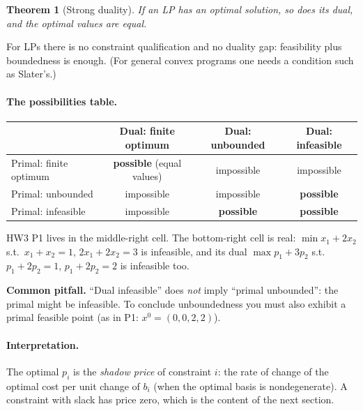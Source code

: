 \documentclass[11pt]{article}
\newenvironment{pitfall}{\colorlet{shadecolor}{warncolor}\begin{shaded}\noindent\textbf{Common pitfall.} }{\end{shaded}}
\theoremstyle{definition}
\theoremstyle{plain}
\newtheorem{theorem}[definition]{Theorem}
\theoremstyle{remark}
\begin{document}
\begin{theorem}[Strong duality]
If an LP has an optimal solution, so does its dual, and the optimal values are equal.
\end{theorem}
For LPs there is no constraint qualification and no duality gap: feasibility plus boundedness is enough. (For general convex programs one needs a condition such as Slater's.)

\paragraph{The possibilities table.}
\begin{center}\renewcommand{\arraystretch}{1.2}
\begin{tabular}{@{}lccc@{}}\toprule
 & Dual: finite optimum & Dual: unbounded & Dual: infeasible\\ \midrule
Primal: finite optimum & \textbf{possible} (equal values) & impossible & impossible\\
Primal: unbounded & impossible & impossible & \textbf{possible}\\
Primal: infeasible & impossible & \textbf{possible} & \textbf{possible}\\ \bottomrule
\end{tabular}\end{center}
HW3 P1 lives in the middle-right cell. The bottom-right cell is real: $\min x_1+2x_2$ s.t.\ $x_1+x_2=1$, $2x_1+2x_2=3$ is infeasible, and its dual $\max p_1+3p_2$ s.t.\ $p_1+2p_2=1$, $p_1+2p_2=2$ is infeasible too.

\begin{pitfall}
``Dual infeasible'' does \emph{not} imply ``primal unbounded'': the primal might be infeasible. To conclude unboundedness you must also exhibit a primal feasible point (as in P1: $x^0=(0,0,2,2)$).
\end{pitfall}

\paragraph{Interpretation.} The optimal $p_i$ is the \emph{shadow price} of constraint $i$: the rate of change of the optimal cost per unit change of $b_i$ (when the optimal basis is nondegenerate). A constraint with slack has price zero, which is the content of the next section.
\end{document}
